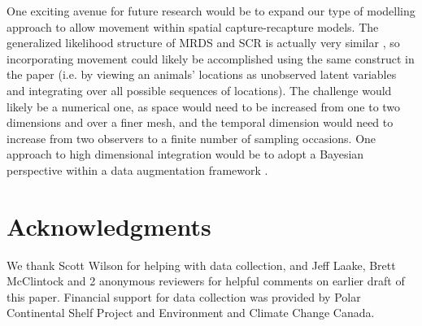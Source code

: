 \documentclass[aoas,preprint]{imsart}
\numberwithin{equation}{section}
\theoremstyle{plain}
\begin{document}
One exciting avenue for future research would be to expand our type of modelling approach to allow movement within spatial capture-recapture \citep[SCR; e.g.][]{BorchersEfford2008,RoyleEtAl2013book} models.  The generalized likelihood structure of MRDS and SCR is actually very similar \citep{BorchersEtAl2015,BorchersMarques2017}, so incorporating movement could likely be accomplished using the same construct in the paper (i.e. by viewing an animals' locations as unobserved latent variables and integrating over all possible sequences of locations).  The challenge would likely be a numerical one, as space would need to be increased from one to two dimensions and over a finer mesh, and the temporal dimension would need to increase from two observers to a finite number of sampling occasions.  One approach to high dimensional integration would be to adopt a Bayesian perspective within a data augmentation framework \citep{RoyleEtAl2007b,ConnEtAl2012}.

\section*{Acknowledgments}
We thank Scott Wilson for helping with data collection, and Jeff Laake, Brett McClintock and 2 anonymous reviewers for helpful comments on earlier draft of this paper.  Financial support for data collection was provided by Polar Continental Shelf Project and Environment and Climate Change Canada.



\end{document}
